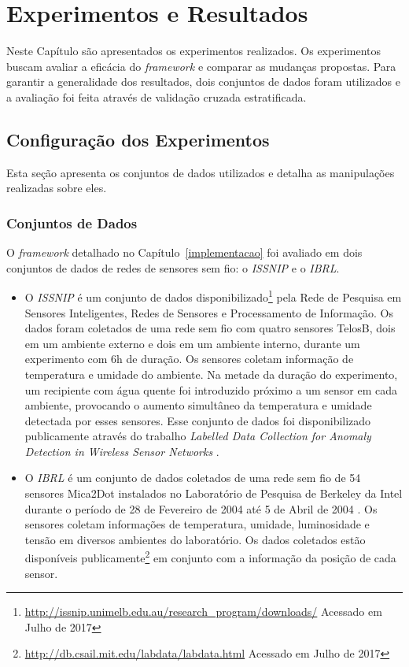 \documentclass[cic,tc]{iiufrgs}
\begin{document}
\chapter{Experimentos e Resultados}
\label{experimentos}
Neste Capítulo são apresentados os experimentos realizados. Os experimentos buscam avaliar a eficácia do \textit{framework} e comparar as mudanças propostas. Para garantir a generalidade dos resultados, dois conjuntos de dados foram utilizados e a avaliação foi feita através de validação cruzada estratificada.

\section{Configuração dos Experimentos}
Esta seção apresenta os conjuntos de dados utilizados e detalha as manipulações realizadas sobre eles. 

\subsection{Conjuntos de Dados}
O \textit{framework} detalhado no Capítulo~\ref{implementacao} foi avaliado em dois conjuntos de dados de redes de sensores sem fio: o \textit{ISSNIP} e o \textit{IBRL}.

\begin{itemize}
    \item O \textit{ISSNIP} é um conjunto de dados disponibilizado\footnote{\url{http://issnip.unimelb.edu.au/research\_program/downloads/} Acessado em Julho de 2017} pela Rede de Pesquisa em Sensores Inteligentes, Redes de Sensores e Processamento de Informação. Os dados foram coletados de uma rede sem fio com quatro sensores TelosB, dois em um ambiente externo e dois em um ambiente interno, durante um experimento com 6h de duração. Os sensores coletam informação de temperatura e umidade do ambiente. Na metade da duração do experimento, um recipiente com água quente foi introduzido próximo a um sensor em cada ambiente, provocando o aumento simultâneo da temperatura e umidade detectada por esses sensores. Esse conjunto de dados foi disponibilizado publicamente através do trabalho \textit{Labelled Data Collection for Anomaly Detection in Wireless Sensor Networks} \cite{labelled2010}.
    \item O \textit{IBRL} é um conjunto de dados coletados de uma rede sem fio de 54 sensores Mica2Dot instalados no Laboratório de Pesquisa de Berkeley da Intel durante o período de 28 de Fevereiro de 2004 até 5 de Abril de 2004 \cite{ibrl}. Os sensores coletam informações de temperatura, umidade, luminosidade e tensão em diversos ambientes do laboratório. Os dados coletados estão disponíveis publicamente\footnote{\url{http://db.csail.mit.edu/labdata/labdata.html} Acessado em Julho de 2017} em conjunto com a informação da posição de cada sensor.
\end{itemize}
\end{document}
